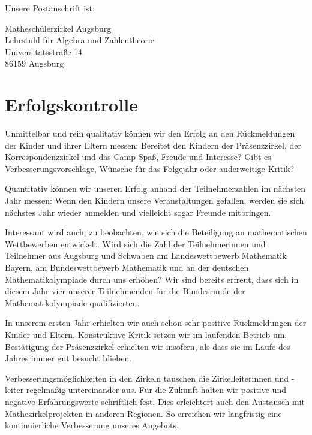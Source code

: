 \documentclass[12pt]{zettel}
\begin{document}
Unsere Postanschrift ist:
\vspace{-0.5em}
\begin{tabbing}
  {\qquad} Matheschülerzirkel Augsburg \\
  {\qquad} Lehrstuhl für Algebra und Zahlentheorie \\
  {\qquad} Universitätsstraße 14 \\
  {\qquad} 86159 Augsburg
\end{tabbing}


\section{Erfolgskontrolle}

Unmittelbar und rein qualitativ können wir den Erfolg an den Rückmeldungen der
Kinder und ihrer Eltern messen: Bereitet den Kindern der Präsenzzirkel, der
Korrespondenzzirkel und das Camp Spaß, Freude und Interesse? Gibt es
Verbesserungsvorschläge, Wünsche für das Folgejahr oder anderweitige Kritik?

Quantitativ können wir unseren Erfolg anhand der Teilnehmerzahlen im nächsten
Jahr messen: Wenn den Kindern unsere Veranstaltungen gefallen, werden sie sich
nächstes Jahr wieder anmelden und vielleicht sogar Freunde mitbringen.

Interessant wird auch, zu beobachten, wie sich die Beteiligung an
mathematischen Wettbewerben entwickelt. Wird sich die Zahl der
Teilnehmerinnen und Teilnehmer aus Augsburg und Schwaben am Landeswettbewerb
Mathematik Bayern, am Bundeswettbewerb Mathematik und an der deutschen
Mathematikolympiade durch uns erhöhen? Wir sind bereits erfreut,
dass sich in diesem Jahr vier unserer Teilnehmenden für die
Bundesrunde der Mathematikolympiade qualifizierten.

In unserem ersten Jahr erhielten wir auch schon sehr positive Rückmeldungen der
Kinder und Eltern. Konstruktive Kritik setzen wir im laufenden Betrieb um. Bestätigung der Präsenzzirkel erhielten wir insofern, als dass sie im Laufe des Jahres immer gut besucht blieben.

Verbesserungsmöglichkeiten in den Zirkeln tauschen die Zirkelleiterinnen und -leiter regelmäßig untereinander aus. Für die Zukunft halten wir positive und negative Erfahrungswerte schriftlich fest. Dies erleichtert auch den Austausch mit Mathezirkelprojekten in anderen Regionen. So erreichen wir langfristig eine kontinuierliche Verbesserung unseres Angebots.
\end{document}

